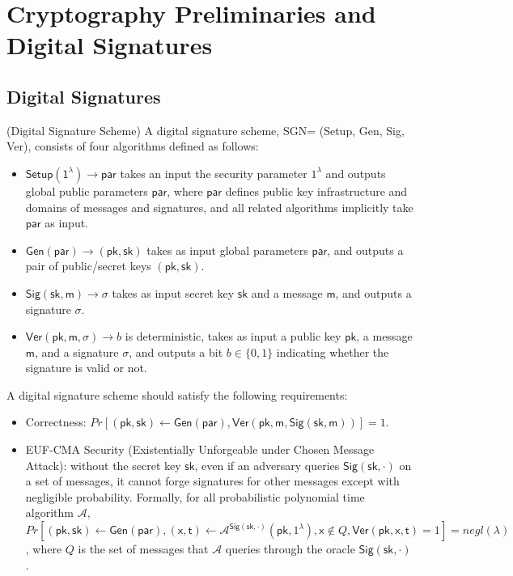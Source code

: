 \section{Cryptography Preliminaries and Digital Signatures} \label{sec:basic}

\subsection{Digital Signatures}

\begin{definition}{(Digital Signature Scheme)} A digital signature scheme, {\sffamily SGN= (Setup, Gen, Sig, Ver)}, consists of four algorithms defined as follows: 
\end{definition}
\begin{itemize}
    \item $\mathsf{Setup(1^\lambda) \to par}$ takes an input the security parameter $1^\lambda$ and outputs global public parameters $\mathsf{par}$, where $\mathsf{par}$ defines public key infrastructure and domains of messages and signatures, and all related algorithms implicitly take $\mathsf{par}$ as input.  
    \item $\mathsf{Gen(par)} \to (\mathsf{pk}, \mathsf{sk})$ takes as input global parameters $\mathsf{par}$, and outputs a pair of public/secret keys $(\mathsf{pk}, \mathsf{sk})$. 
    \item $\mathsf{Sig(sk, m)} \to \sigma$ takes as input secret key $\mathsf{sk}$ and a message $\mathsf{m}$, and outputs a signature $\sigma$. 
    \item $\mathsf{Ver}(\mathsf{pk}, \mathsf{m}, \sigma) \to b $ is deterministic, takes as input a public key $\mathsf{pk}$, a message $\mathsf{m}$, and a signature $\sigma$,  and outputs a bit $b\in\{0,1\}$ indicating whether the signature is valid or not. 
\end{itemize}

A digital signature scheme should satisfy the following requirements:
\begin{itemize}
    \item Correctness: $Pr[(\mathsf{pk}, \mathsf{sk})\leftarrow \mathsf{Gen(par)}, \mathsf{Ver(pk, m, Sig(sk, m))}]=1$. 
    \item EUF-CMA Security (Existentially Unforgeable under Chosen Message Attack): without the secret key $\mathsf{sk}$, even if an adversary queries $\mathsf{Sig(sk, \cdot)}$ on a set of messages, it cannot forge signatures for other messages except with negligible probability. Formally, for all probabilistic polynomial time algorithm $\mathcal{A}$, $Pr[(\mathsf{pk}, \mathsf{sk})\leftarrow \mathsf{Gen(par)}, (\mathsf{x},\mathsf{t})\leftarrow \mathcal{A}^{\mathsf{Sig(sk, \cdot)}}(\mathsf{pk}, 1^\lambda), \mathsf{x}\notin Q, \mathsf{Ver(pk, x, t)}=1] = negl(\lambda)$, where $Q$ is the set of messages that $\mathcal{A}$ queries through the oracle $\mathsf{Sig(sk, \cdot)}$. 
    
\end{itemize}

